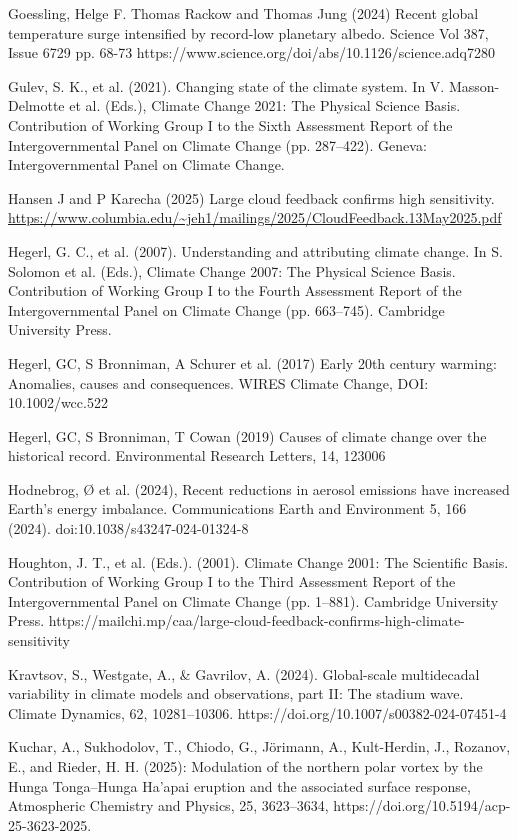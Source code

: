 \documentclass[12pt,paper=a4,DIV=12,parskip=never,chapterprefix=false,headings=standardclasses]{scrreprt}
\begin{document}
Goessling, Helge F. Thomas Rackow and Thomas Jung (2024) Recent global temperature surge
intensified by record-low planetary albedo. Science Vol 387, Issue 6729 pp. 68-73
https://www.science.org/doi/abs/10.1126/science.adq7280

Gulev, S. K., et al. (2021). Changing state of the climate system. In V. Masson-Delmotte et al. (Eds.),
Climate Change 2021: The Physical Science Basis. Contribution of Working Group I to the Sixth
Assessment Report of the Intergovernmental Panel on Climate Change (pp. 287–422). Geneva:
Intergovernmental Panel on Climate Change.

Hansen J and P Karecha (2025) Large cloud feedback confirms high sensitivity.
\url{https://www.columbia.edu/~jeh1/mailings/2025/CloudFeedback.13May2025.pdf}

Hegerl, G. C., et al. (2007). Understanding and attributing climate change. In S. Solomon et al. (Eds.),
Climate Change 2007: The Physical Science Basis. Contribution of Working Group I to the Fourth
Assessment Report of the Intergovernmental Panel on Climate Change (pp. 663–745). Cambridge
University Press.

Hegerl, GC, S Bronniman, A Schurer et al. (2017) Early 20th century warming: Anomalies, causes and
consequences. WIRES Climate Change, DOI: 10.1002/wcc.522

Hegerl, GC, S Bronniman, T Cowan (2019) Causes of climate change over the historical record.
Environmental Research Letters, 14, 123006

Hodnebrog, Ø et al. (2024), Recent reductions in aerosol emissions have increased Earth’s energy
imbalance. Communications Earth and Environment 5, 166 (2024). doi:10.1038/s43247-024-01324-8

Houghton, J. T., et al. (Eds.). (2001). Climate Change 2001: The Scientific Basis. Contribution of
Working Group I to the Third Assessment Report of the Intergovernmental Panel on Climate Change
(pp. 1–881). Cambridge University Press.
https://mailchi.mp/caa/large-cloud-feedback-confirms-high-climate-sensitivity

Kravtsov, S., Westgate, A., \& Gavrilov, A. (2024). Global-scale multidecadal variability in climate
models and observations, part II: The stadium wave. Climate Dynamics, 62, 10281–10306.
https://doi.org/10.1007/s00382-024-07451-4

Kuchar, A., Sukhodolov, T., Chiodo, G., Jörimann, A., Kult-Herdin, J., Rozanov, E., and Rieder, H. H.
(2025): Modulation of the northern polar vortex by the Hunga Tonga–Hunga Ha'apai eruption and the
associated surface response, Atmospheric Chemistry and Physics, 25, 3623–3634,
https://doi.org/10.5194/acp-25-3623-2025.
\end{document}
